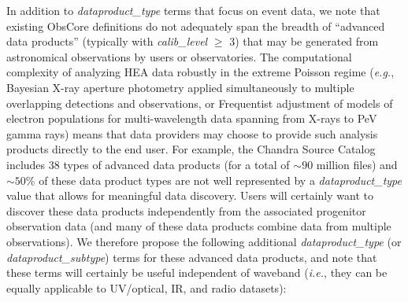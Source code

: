 \documentclass[11pt,a4paper]{ivoa}
\begin{document}

In addition to {\em dataproduct\_type\/} terms that focus on event data, we note that existing ObsCore definitions do not adequately span the breadth of ``advanced data products'' (typically with {\em calib\_level\/} $\ge$ 3) that may be generated from astronomical observations by users or observatories. The computational complexity of analyzing \gls{HEA} data robustly in the extreme Poisson regime ({\em e.g.\/}, Bayesian X-ray aperture photometry applied simultaneously to multiple overlapping detections and observations, or Frequentist adjustment of models of electron populations for multi-wavelength data spanning from X-rays to PeV gamma rays) means that data providers may choose to provide such analysis products directly to the end user. For example, the Chandra Source Catalog includes 38 types of advanced data products (for a total of $\sim\!90$ million files) and $\sim\!50$\% of these data product types are not well represented by a  {\em dataproduct\_type\/} value that allows for meaningful data discovery. Users will certainly want to discover these data products independently from the associated progenitor observation data (and many of these data products combine data from multiple observations). We therefore propose the following additional {\em dataproduct\_type\/} (or {\em dataproduct\_subtype\/}) terms for these advanced data products, and note that these terms will certainly be useful independent of waveband ({\em i.e.\/}, they can be equally applicable to UV/optical, IR, and radio datasets):
\end{document}
